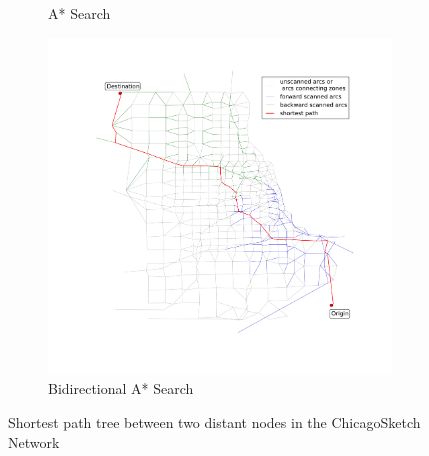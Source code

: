 \begin{figure}
\begin{subfigure}{.5\textwidth}
        \caption{A* Search}
        \label{fig:chicago_astar}
    \end{subfigure}%
    \begin{subfigure}{.5\textwidth}
        \centering
        \includegraphics[width=\textwidth,trim=120px 120px 48px 0px,clip]{img/chicago_astar_bidirect}
        \caption{Bidirectional A* Search}
        \label{fig:chicago_astar_bidirect}
    \end{subfigure}
    \vspace{1em}
    \caption{Shortest path tree between two distant nodes in the ChicagoSketch Network}
    \label{fig:long_sptree}
\end{figure}

